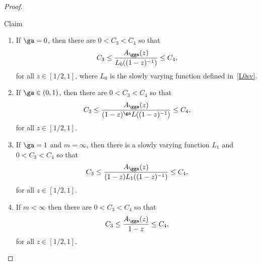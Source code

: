 \begin{proof}
\begin{enonce*}{Claim} 
\begin{enumerate}\alphenumi
\item \label{c1} If $\ga = 0$, then there are $0 < C_3 < C_4$ so that
\begin{equation}\label{claim_a_zero}
C_3 \leq \frac{A_\gga(z)}{L_0((1 - z)^{-1})} \leq C_4,
\end{equation}
for all $z \in [1/2,1]$, where $L_0$ is the slowly varying function defined in~\eqref{L0sv}.
\item \label{c2} If $\ga \in (0,1)$, then there are $0 < C_3 < C_4$ so that
\begin{equation}
C_3 \leq \frac{A_\gga(z)}{(1 - z)^\ga L((1 - z)^{-1})} \leq C_4,
\end{equation}
for all $z \in [1/2,1]$.
\item \label{c3} If $\ga = 1$ and $m = \infty$, then there is a slowly varying function $L_1$ and $0 < C_3 < C_4$ so that
\begin{equation}
C_3 \leq \frac{A_\gga(z)}{(1 - z) L_1((1 - z)^{-1})} \leq C_4,
\end{equation}
for all $z \in [1/2,1]$.
\item \label{c4} If $m < \infty$ then there are $0 < C_3 < C_4$ so that
\begin{equation}
C_3 \leq \frac{A_\gga(z)}{1 - z} \leq C_4,
\end{equation}
for all $z\in[1/2, 1]$.
\end{enumerate}
\end{enonce*}


\end{proof}
